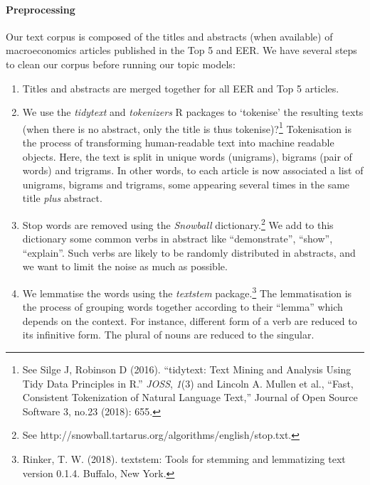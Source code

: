 \documentclass[]{elsarticle} %
\providecommand{\tightlist}{%
  \setlength{\itemsep}{0pt}\setlength{\parskip}{0pt}}
\begin{document}
\hypertarget{preprocessing}{%
\paragraph*{Preprocessing}\label{preprocessing}}

Our text corpus is composed of the titles and abstracts (when available)
of macroeconomics articles published in the Top 5 and EER. We have
several steps to clean our corpus before running our topic models:

\begin{enumerate}
\def\labelenumi{\arabic{enumi}.}
\tightlist
\item
  Titles and abstracts are merged together for all EER and Top 5
  articles.
\item
  We use the \emph{tidytext} and \emph{tokenizers} R packages to
  `tokenise' the resulting texts (when there is no abstract, only the
  title is thus tokenise)?\footnote{See Silge J, Robinson D (2016).
    ``tidytext: Text Mining and Analysis Using Tidy Data Principles in
    R.'' \emph{JOSS}, \emph{1}(3) and Lincoln A. Mullen et al., ``Fast,
    Consistent Tokenization of Natural Language Text,'' Journal of Open
    Source Software 3, no.23 (2018): 655.} Tokenisation is the process
  of transforming human-readable text into machine readable objects.
  Here, the text is split in unique words (unigrams), bigrams (pair of
  words) and trigrams. In other words, to each article is now associated
  a list of unigrams, bigrams and trigrams, some appearing several times
  in the same title \emph{plus} abstract.
\item
  Stop words are removed using the \emph{Snowball}
  dictionary.\footnote{See
    http://snowball.tartarus.org/algorithms/english/stop.txt.} We add to
  this dictionary some common verbs in abstract like ``demonstrate'',
  ``show'', ``explain''. Such verbs are likely to be randomly
  distributed in abstracts, and we want to limit the noise as much as
  possible.
\item
  We lemmatise the words using the \emph{textstem} package.\footnote{Rinker,
    T. W. (2018). textstem: Tools for stemming and lemmatizing text
    version 0.1.4. Buffalo, New York.} The lemmatisation is the process
  of grouping words together according to their ``lemma'' which depends
  on the context. For instance, different form of a verb are reduced to
  its infinitive form. The plural of nouns are reduced to the singular.
\end{enumerate}
\end{document}
